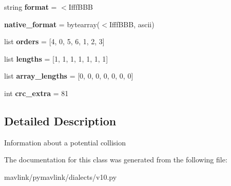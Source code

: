 \begin{DoxyCompactItemize}
string {\bfseries format} = \textquotesingle{}$<$Ifff\+B\+BB\textquotesingle{}
\item 
\mbox{\label{classpymavlink_1_1dialects_1_1v10_1_1MAVLink__collision__message_ab3b12eb3141d8c02f1507fa1575d7f6b}} 
{\bfseries native\+\_\+format} = bytearray(\textquotesingle{}$<$Ifff\+B\+BB\textquotesingle{}, \textquotesingle{}ascii\textquotesingle{})
\item 
\mbox{\label{classpymavlink_1_1dialects_1_1v10_1_1MAVLink__collision__message_a472dac76dc32a64b63324a35ab1003d2}} 
list {\bfseries orders} = \mbox{[}4, 0, 5, 6, 1, 2, 3\mbox{]}
\item 
\mbox{\label{classpymavlink_1_1dialects_1_1v10_1_1MAVLink__collision__message_a796e8f946b799960705b32af3b116b02}} 
list {\bfseries lengths} = \mbox{[}1, 1, 1, 1, 1, 1, 1\mbox{]}
\item 
\mbox{\label{classpymavlink_1_1dialects_1_1v10_1_1MAVLink__collision__message_a74bfefe05de0afa38861e22d02724628}} 
list {\bfseries array\+\_\+lengths} = \mbox{[}0, 0, 0, 0, 0, 0, 0\mbox{]}
\item 
\mbox{\label{classpymavlink_1_1dialects_1_1v10_1_1MAVLink__collision__message_afa8084c67aba002f39158f62db918823}} 
int {\bfseries crc\+\_\+extra} = 81
\end{DoxyCompactItemize}


\subsection{Detailed Description}
\begin{DoxyVerb}Information about a potential collision
\end{DoxyVerb}
 

The documentation for this class was generated from the following file\+:\begin{DoxyCompactItemize}
\item 
mavlink/pymavlink/dialects/v10.\+py\end{DoxyCompactItemize}
